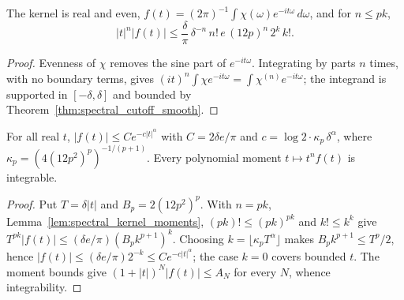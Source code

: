 \begin{lemma}
    \label{lem:spectral_kernel_moments}
    \leanok
    The kernel is real and even, $f(t)=(2\pi)^{-1}\int\chi(\omega)
        e^{-it\omega}\,d\omega$, and for $n\le pk$,
    \[
        |t|^n|f(t)|\le\frac{\delta}{\pi}\,\delta^{-n}\,n!\,e\,(12p)^n\,
        2^k\,k!.
    \]
\end{lemma}
\begin{proof}\leanok
    Evenness of $\chi$ removes the sine part of $e^{-it\omega}$.
    Integrating by parts $n$ times, with no boundary terms, gives
    $(it)^n\int\chi e^{-it\omega}=\int\chi^{(n)}e^{-it\omega}$; the
    integrand is supported in $[-\delta,\delta]$ and bounded by
    Theorem~\ref{thm:spectral_cutoff_smooth}.
\end{proof}

\begin{theorem}
    \label{thm:spectral_kernel_decay}
    \leanok
    For all real $t$,
    $|f(t)|\le C e^{-c|t|^\alpha}$ with $C=2\delta e/\pi$ and
    $c=\log2\cdot\kappa_p\,\delta^\alpha$, where
    $\kappa_p=(4(12p^2)^p)^{-1/(p+1)}$. Every polynomial moment
    $t\mapsto t^nf(t)$ is integrable.
\end{theorem}
\begin{proof}\leanok
    Put $T=\delta|t|$ and $B_p=2(12p^2)^p$. With $n=pk$,
    Lemma~\ref{lem:spectral_kernel_moments}, $(pk)!\le(pk)^{pk}$ and
    $k!\le k^k$ give $T^{pk}|f(t)|\le(\delta e/\pi)(B_pk^{p+1})^k$. Choosing
    $k=\lfloor\kappa_pT^\alpha\rfloor$ makes $B_pk^{p+1}\le T^p/2$, hence
    $|f(t)|\le(\delta e/\pi)2^{-k}\le Ce^{-c|t|^\alpha}$; the case $k=0$
    covers bounded $t$. The moment bounds give
    $(1+|t|)^N|f(t)|\le A_N$ for every $N$, whence integrability.
\end{proof}


